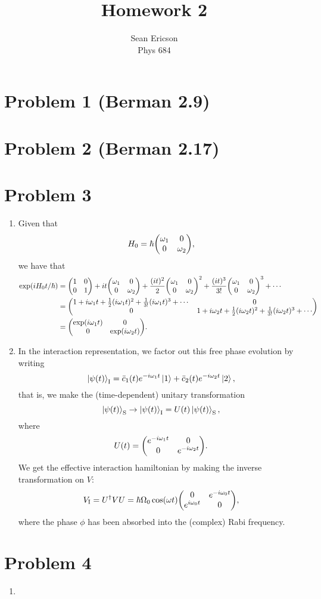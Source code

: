 \documentclass[12pt]{article}
\begin{document}
	
\title{Homework 2}
\author{Sean Ericson \\ Phys 684}
\maketitle

\section*{Problem 1 {\small (Berman 2.9)}}

\section*{Problem 2 {\small (Berman 2.17)}}

\section*{Problem 3}
\begin{enumerate}[label=(\alph*)]
    \item Given that
    \[ H_0 = \hbar\mqty(\omega_1&0\\0&\omega_2), \]
    we have that
    \begin{align*}
        \exp(iH_0t/\hbar) &= \mqty(1&0\\0&1) + it\mqty(\omega_1&0\\0&\omega_2) + \frac{(it)^2}{2}\mqty(\omega_1&0\\0&\omega_2)^2 + \frac{(it)^3}{3!}\mqty(\omega_1&0\\0&\omega_2)^3 + \cdots \\
        &= \mqty(1 + i\omega_1t + \frac{1}{2}(i\omega_1t)^2 + \frac{1}{3!}(i\omega_1 t)^3 + \cdots & 0 \\ 0 & 1 + i\omega_2t + \frac{1}{2}(i\omega_2t)^2 + \frac{1}{3!}(i\omega_2t)^3 + \cdots) \\
        &= \mqty(\exp(i\omega_1t)&0\\0&\exp(i\omega_2t)).
    \end{align*}

    \item In the interaction representation, we factor out this free phase evolution by writing
    \[ \ket{\psi(t)}_\text{I} = \bar{c}_1(t)e^{-i\omega_1t}\ket{1} + \bar{c}_2(t)e^{-i\omega_2t}\ket{2}, \]
    that is, we make the (time-dependent) unitary transformation
    \[ \ket{\psi(t)}_\text{S} \to \ket{\psi(t)}_\text{I} = U(t)\ket{\psi(t)}_\text{S}, \]
    where
    \[ U(t) = \mqty(e^{-i\omega_1t}&0\\0&e^{-i\omega_2t}). \] 
    We get the effective interaction hamiltonian by making the inverse transformation on $V$:
    \[ V_\text{I} = U^\dag VU = \hbar\Omega_0 \cos(\omega t) \mqty(0&e^{-i\omega_0t}\\e^{i\omega_0t}&0), \]
    where the phase $\phi$ has been absorbed into the (complex) Rabi frequency.
\end{enumerate}

\section*{Problem 4}
\begin{enumerate}[label=(\alph*)]
    \item 
\end{enumerate}
\end{document}
